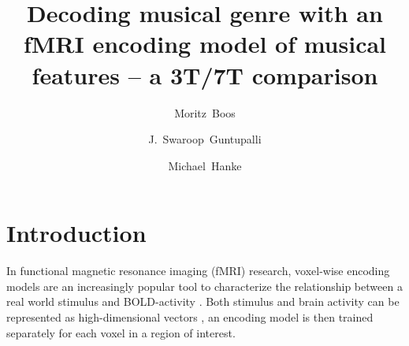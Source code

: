 



\title{Decoding musical genre with an fMRI encoding model of musical
features -- a 3T/7T comparison}


\author[1]{Moritz~Boos}
\author[2]{J.~Swaroop~Guntupalli}
\author[3,4]{Michael~Hanke}

\maketitle
\thispagestyle{fancy}

\listoftodos

\begin{abstract}

\end{abstract}

\clearpage


\section*{Introduction}




In functional magnetic resonance imaging (f{MRI}) research, voxel-wise encoding
models are an increasingly popular tool to characterize the relationship
between a real world stimulus and BOLD-activity \cite{NG11}.
Both stimulus and brain activity can be represented as high-dimensional vectors
\cite{HCG14}, an encoding model is then trained separately for each voxel in a
region of interest. 

